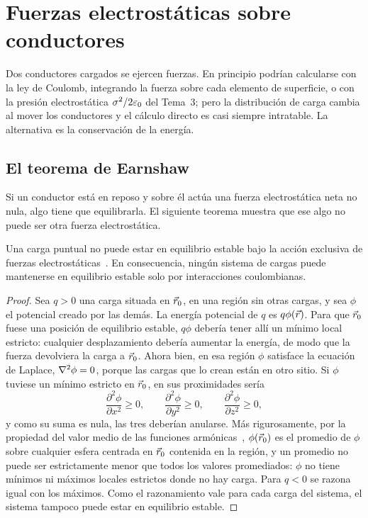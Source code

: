 \section{Fuerzas electrostáticas sobre conductores}\label{sec:fuerzas}

Dos conductores cargados se ejercen fuerzas. En principio podrían calcularse con la ley de Coulomb, integrando la fuerza sobre cada
elemento de superficie, o con la presión electrostática $\sigma^2/2\varepsilon_0$ del Tema~3; pero la distribución de carga cambia al mover los
conductores y el cálculo directo es casi siempre intratable. La alternativa es la conservación de la energía.

\subsection{El teorema de Earnshaw}

Si un conductor está en reposo y sobre él actúa una fuerza electrostática neta no nula, algo tiene que equilibrarla. El siguiente
teorema muestra que ese algo no puede ser otra fuerza electrostática.

\begin{teorema}[Earnshaw, 1842]\label{teo:earnshaw}
Una carga puntual no puede estar en equilibrio estable bajo la acción exclusiva de fuerzas electrostáticas~\cite{Earnshaw}. En consecuencia, ningún
sistema de cargas puede mantenerse en equilibrio estable solo por interacciones coulombianas.
\end{teorema}

\begin{proof}
Sea $q>0$ una carga situada en $\vec r_0$, en una región sin otras cargas, y sea $\phi$ el potencial creado por las demás. La energía potencial de
$q$ es $q\phi(\vec r)$. Para que $\vec r_0$ fuese una posición de equilibrio estable, $q\phi$ debería tener allí un mínimo local estricto: cualquier
desplazamiento debería aumentar la energía, de modo que la fuerza devolviera la carga a $\vec r_0$. Ahora bien, en esa región $\phi$ satisface la
ecuación de Laplace, $\nabla^2\phi=0$, porque las cargas que lo crean están en otro sitio. Si $\phi$ tuviese un mínimo estricto en $\vec r_0$, en sus
proximidades sería
\[
  \frac{\partial^2\phi}{\partial x^2}\geq0,\qquad\frac{\partial^2\phi}{\partial y^2}\geq0,\qquad\frac{\partial^2\phi}{\partial z^2}\geq0,
\]
y como su suma es nula, las tres deberían anularse. Más rigurosamente, por la propiedad del valor medio de las funciones armónicas~\cite{T3,Kellogg},
$\phi(\vec r_0)$ es el promedio de $\phi$ sobre cualquier esfera centrada en $\vec r_0$ contenida en la región, y un promedio no puede ser estrictamente
menor que todos los valores promediados: $\phi$ no tiene mínimos ni máximos locales estrictos donde no hay carga. Para $q<0$ se razona igual con los
máximos. Como el razonamiento vale para cada carga del sistema, el sistema tampoco puede estar en equilibrio estable.
\end{proof}

